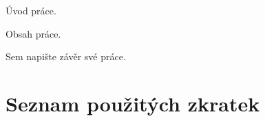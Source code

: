 \documentclass[thesis=B,czech,hidelinks]{src/FITthesisXE}
\begin{document}
\begin{introduction}
\label{introduction}
	Úvod práce.
\end{introduction}

Obsah práce.

\begin{conclusion}
\label{conclusion}
	Sem napište závěr své práce.
\end{conclusion}

\printbibliography[title={Zdroje}]

\appendix

\chapter{Seznam použitých zkratek}
\printglossary[type=\acronymtype,style=acronyms]


\end{document}
